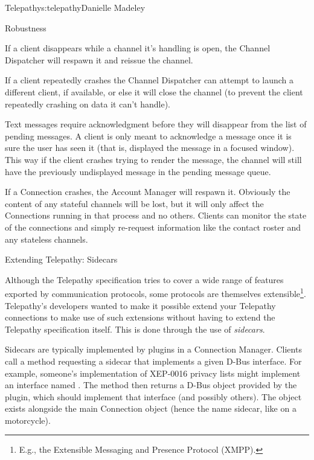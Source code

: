 \begin{aosachapter}{Telepathy}{s:telepathy}{Danielle Madeley}
\begin{aosasect1}{Robustness}
\begin{aosaitemize}
  \item If a client disappears while a channel it's handling is open,
    the Channel Dispatcher will respawn it and reissue the channel.

    If a client repeatedly crashes the Channel Dispatcher can attempt
    to launch a different client, if available, or else it will close
    the channel (to prevent the client repeatedly crashing on data it
    can't handle).

    Text messages require acknowledgment before they will disappear
    from the list of pending messages. A client is only meant to
    acknowledge a message once it is sure the user has seen it (that
    is, displayed the message in a focused window). This way if the
    client crashes trying to render the message, the channel will
    still have the previously undisplayed message in the pending
    message queue.

  \item If a Connection crashes, the Account Manager will respawn
    it. Obviously the content of any stateful channels will be lost,
    but it will only affect the Connections running in that process
    and no others. Clients can monitor the state of the connections
    and simply re-request information like the contact roster and any
    stateless channels.

\end{aosaitemize}

\end{aosasect1}

\begin{aosasect1}{Extending Telepathy: Sidecars}

Although the Telepathy specification tries to cover a wide range of
features exported by communication protocols, some protocols are
themselves extensible\footnote{E.g., the Extensible Messaging and
 Presence Protocol (XMPP).}.  Telepathy's developers wanted to make
it possible extend your Telepathy connections to make use of such
extensions without having to extend the Telepathy specification
itself. This is done through the use of \emph{sidecars}.

Sidecars are typically implemented by plugins in a Connection Manager.
Clients call a method requesting a sidecar that implements a given
D-Bus interface.  For example, someone's implementation of XEP-0016
privacy lists might implement an interface named
. The method then returns a D-Bus
object provided by the plugin, which should implement that interface
(and possibly others). The object exists alongside the main Connection
object (hence the name sidecar, like on a motorcycle).


\end{aosasect1}
\end{aosachapter}
